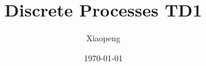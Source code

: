\documentclass[a4paper, 12pt]{article}
\begin{document}
\title{Discrete Processes TD1}
\author{Xiaopeng}
\date{\today}

\maketitle

\setcounter{section}{1}

\end{document}
